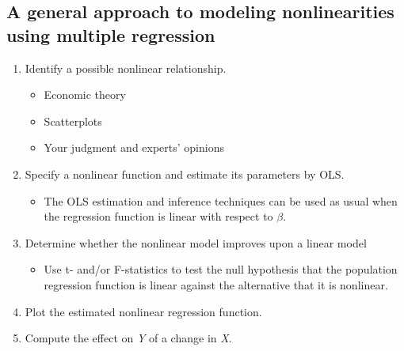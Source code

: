 \documentclass[a4paper,11pt]{article}
\begin{document}
\subsection{A general approach to modeling nonlinearities using multiple regression}
\label{sec:orga2accc6}
\begin{enumerate}
\item Identify a possible nonlinear relationship.
\begin{itemize}
\item Economic theory
\item Scatterplots
\item Your judgment and experts' opinions
\end{itemize}
\item Specify a nonlinear function and estimate its parameters by OLS.
\begin{itemize}
\item The OLS estimation and inference techniques can be used as usual
when the regression function is linear with respect to \(\beta\).
\end{itemize}
\item Determine whether the nonlinear model improves upon a linear model
\begin{itemize}
\item Use t- and/or F-statistics to test the null hypothesis that the
population regression function is linear against the alternative
that it is nonlinear.
\end{itemize}
\item Plot the estimated nonlinear regression function.
\item Compute the effect on \emph{Y} of a change in \emph{X}.
\end{enumerate}
\end{document}

